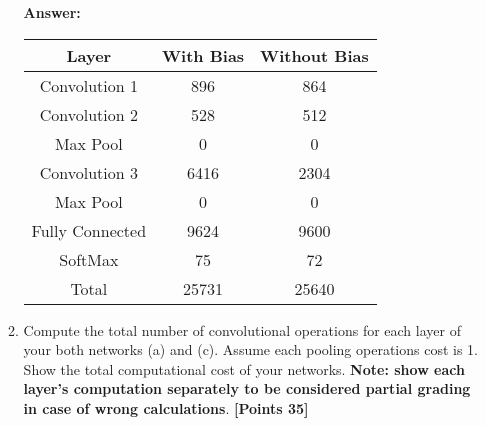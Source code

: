 \documentclass[12pt]{article}
\begin{document}
\begin{enumerate}
\begin{enumerate}
                        \textbf{Answer:}
                        \begin{table}[h]
                              \centering
                              \begin{tabular}{|ccc|}
                                    \hline
                                    \textbf{Layer}  & \textbf{With Bias} & \textbf{Without Bias} \\
                                    \hline
                                    Convolution 1   & 896                & 864                   \\
                                    \hline
                                    Convolution 2   & 528                & 512                   \\
                                    \hline
                                    Max Pool        & 0                  & 0                     \\
                                    \hline
                                    Convolution 3   & 6416               & 2304                  \\
                                    \hline
                                    Max Pool        & 0                  & 0                     \\
                                    \hline
                                    Fully Connected & 9624               & 9600                  \\
                                    \hline
                                    SoftMax         & 75                 & 72                    \\
                                    \hline
                                    Total           & 25731              & 25640                 \\
                                    \hline
                              \end{tabular}
                        \end{table}
                  \item Compute the total number of convolutional operations for
                        each layer of your both networks (a) and (c). Assume
                        each pooling operations cost is 1. Show the total
                        computational cost of your networks. \textbf{Note: show
                              each layer’s computation separately to be considered
                              partial grading in case of wrong calculations}.
                        \textbf{[Points 35]}
            \end{enumerate}
\end{enumerate}
\end{document}
